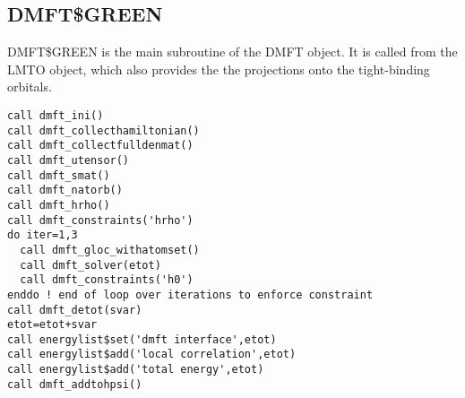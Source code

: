 \documentclass[11pt,a4paper]{report}
\begin{document}
\subsection{DMFT\$GREEN}
DMFT\$GREEN is the main subroutine of the DMFT object. It is called
from the LMTO object, which also provides the the projections onto the
tight-binding orbitals.

\begin{verbatim}
call dmft_ini()
call dmft_collecthamiltonian()  
call dmft_collectfulldenmat()  
call dmft_utensor() 
call dmft_smat()
call dmft_natorb()
call dmft_hrho()
call dmft_constraints('hrho')
do iter=1,3
  call dmft_gloc_withatomset() 
  call dmft_solver(etot) 
  call dmft_constraints('h0')
enddo ! end of loop over iterations to enforce constraint
call dmft_detot(svar)
etot=etot+svar      
call energylist$set('dmft interface',etot)
call energylist$add('local correlation',etot)
call energylist$add('total energy',etot)
call dmft_addtohpsi()
\end{verbatim}
\end{document}

